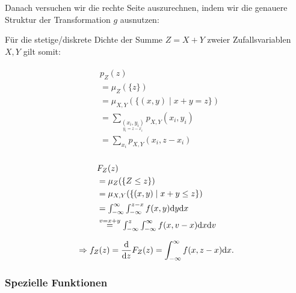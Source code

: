 Danach versuchen wir die rechte Seite auszurechnen,
indem wir die genauere Struktur der Transformation \(g\) ausnutzen:
\newpage
\begin{example}[Summe]
	Für die stetige/diskrete Dichte  der Summe \(Z = X + Y\) zweier Zufallsvariablen \(X,Y\) gilt somit:

	\begin{multicols}{2}
		\noindent
		\begin{eqnarray*}
			\begin{split}
				&p_Z(z)	\\
				&= \mu_Z (\{ z \}) \\
				&= \mu_{X,Y}(\{(x,y) \mid x+y=z\}) \\
				&= \textstyle \sum_{\underset{ y_i=z-x_i}{(x_i,y_i)}} p_{X,Y}(x_i,y_i) \\
				&= \textstyle \sum_{x_i} p_{X,Y}(x_i,z-x_i) \\
			\end{split}
		\end{eqnarray*}

		\columnbreak

		\noindent
		\begin{eqnarray*}
			\begin{split}
				&F_Z(z)	 \\
				&= \mu_Z (\{ Z \leq z \}) \\
				&= \mu_{X,Y}(\{(x,y) \mid x+y \leq z\}) \\
				&= \textstyle \int_{-\infty}^\infty \int_{-\infty}^{z-x} f(x,y) \mathrm{d} y \mathrm{d} x \\
				&\stackrel{v=x+y}{=} \textstyle \int_{-\infty}^z \int_{-\infty}^\infty f(x,v-x) \mathrm{d} x \mathrm{d} v \\
			\end{split}
		\end{eqnarray*}

	\end{multicols}

	\[ \Rightarrow f_Z(z) = \frac{\mathrm{d}}{\mathrm{d} z} F_Z(z) = \int_{-\infty}^\infty f(x,z-x) \mathrm{d} x.	\]


\end{example}



\subsubsection{Spezielle Funktionen}

